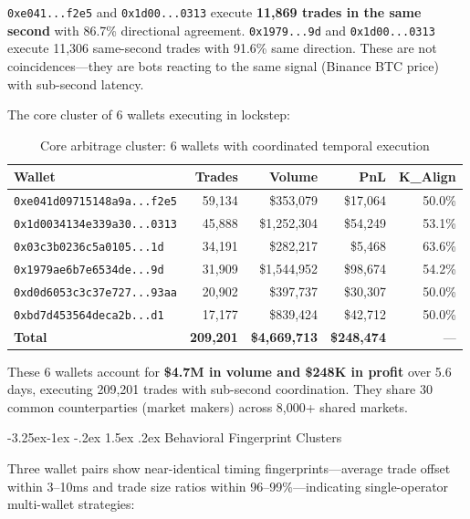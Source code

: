 \documentclass[11pt,a4paper]{article}
\makeatletter
\renewcommand\subsection{\@startsection{subsection}{2}{\z@}%
  {-3.25ex\@plus -1ex \@minus -.2ex}%
  {1.5ex \@plus .2ex}%
  {\normalfont\large\bfseries}}
\makeatother
\begin{document}
\texttt{0xe041...f2e5} and \texttt{0x1d00...0313} execute \textbf{11,869 trades in the same second} with 86.7\% directional agreement. \texttt{0x1979...9d} and \texttt{0x1d00...0313} execute 11,306 same-second trades with 91.6\% same direction. These are not coincidences---they are bots reacting to the same signal (Binance BTC price) with sub-second latency.

The core cluster of 6 wallets executing in lockstep:

\begin{table}[H]
\centering
\caption{Core arbitrage cluster: 6 wallets with coordinated temporal execution}
\label{tab:core_cluster}
\small
\begin{tabular}{@{}lrrrr@{}}
\toprule
\textbf{Wallet} & \textbf{Trades} & \textbf{Volume} & \textbf{PnL} & \textbf{K\_Align} \\
\midrule
\texttt{0xe041d09715148a9a...f2e5} & 59,134 & \$353,079 & \$17,064 & 50.0\% \\
\texttt{0x1d0034134e339a30...0313} & 45,888 & \$1,252,304 & \$54,249 & 53.1\% \\
\texttt{0x03c3b0236c5a0105...1d} & 34,191 & \$282,217 & \$5,468 & 63.6\% \\
\texttt{0x1979ae6b7e6534de...9d} & 31,909 & \$1,544,952 & \$98,674 & 54.2\% \\
\texttt{0xd0d6053c3c37e727...93aa} & 20,902 & \$397,737 & \$30,307 & 50.0\% \\
\texttt{0xbd7d453564deca2b...d1} & 17,177 & \$839,424 & \$42,712 & 50.0\% \\
\midrule
\textbf{Total} & \textbf{209,201} & \textbf{\$4,669,713} & \textbf{\$248,474} & --- \\
\bottomrule
\end{tabular}
\end{table}

These 6 wallets account for \textbf{\$4.7M in volume and \$248K in profit} over 5.6 days, executing 209,201 trades with sub-second coordination. They share 30 common counterparties (market makers) across 8,000+ shared markets.

\subsection{Behavioral Fingerprint Clusters}

Three wallet pairs show near-identical timing fingerprints---average trade offset within 3--10ms and trade size ratios within 96--99\%---indicating single-operator multi-wallet strategies:
\end{document}

